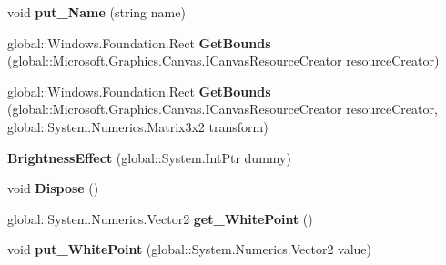 \begin{DoxyCompactItemize}
void {\bfseries put\+\_\+\+Name} (string name)
\item 
\mbox{\label{class_microsoft_1_1_graphics_1_1_canvas_1_1_effects_1_1_brightness_effect_a85bede8b46414570c1d780054b84beff}} 
global\+::\+Windows.\+Foundation.\+Rect {\bfseries Get\+Bounds} (global\+::\+Microsoft.\+Graphics.\+Canvas.\+I\+Canvas\+Resource\+Creator resource\+Creator)
\item 
\mbox{\label{class_microsoft_1_1_graphics_1_1_canvas_1_1_effects_1_1_brightness_effect_a2ff8861d383cf6930766e1f6da167f7d}} 
global\+::\+Windows.\+Foundation.\+Rect {\bfseries Get\+Bounds} (global\+::\+Microsoft.\+Graphics.\+Canvas.\+I\+Canvas\+Resource\+Creator resource\+Creator, global\+::\+System.\+Numerics.\+Matrix3x2 transform)
\item 
\mbox{\label{class_microsoft_1_1_graphics_1_1_canvas_1_1_effects_1_1_brightness_effect_a3e6e5d15295d036a491135b47f360da7}} 
{\bfseries Brightness\+Effect} (global\+::\+System.\+Int\+Ptr dummy)
\item 
\mbox{\label{class_microsoft_1_1_graphics_1_1_canvas_1_1_effects_1_1_brightness_effect_afaaded4b2565482485f12b97a40a0da8}} 
void {\bfseries Dispose} ()
\item 
\mbox{\label{class_microsoft_1_1_graphics_1_1_canvas_1_1_effects_1_1_brightness_effect_af8c1beaca4eb324bb24eaae396efa916}} 
global\+::\+System.\+Numerics.\+Vector2 {\bfseries get\+\_\+\+White\+Point} ()
\item 
\mbox{\label{class_microsoft_1_1_graphics_1_1_canvas_1_1_effects_1_1_brightness_effect_acedd43ed76b47e67db67b3b351732d75}} 
void {\bfseries put\+\_\+\+White\+Point} (global\+::\+System.\+Numerics.\+Vector2 value)
\item 
\mbox{\label{class_microsoft_1_1_graphics_1_1_canvas_1_1_effects_1_1_brightness_effect_ac7be5f6aa71740a4754dfbdeb1fc3515}} 

\end{DoxyCompactItemize}
